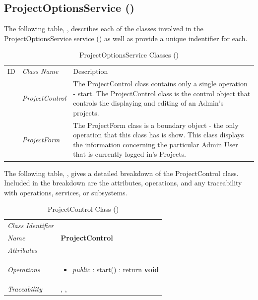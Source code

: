 \documentclass[12pt,letterpaper]{article}
\begin{document}
\subsection{ProjectOptionsService ()}

The following table, , describes each of the classes involved in the ProjectOptionsService service () as well as provide a unique indentifier for each.

\begin{table}[H]
	\caption{ProjectOptionsService Classes ()} 
	\begin{tabu} to 
	    \tableheader{}ID & Class Name & Description \\
		 & ProjectControl & The ProjectControl class contains only a single operation - start. The ProjectControl class is the control object that controls the displaying and editing of an Admin's projects.\\
		 & ProjectForm & The ProjectForm class is a boundary object - the only operation that this class has is show. This class displays the information concerning the particular Admin User that is currently logged in's Projects.\\
	\end{tabu}
\end{table}

The following table, , gives a detailed breakdown of the ProjectControl class. Included in the breakdown are the attributes, operations, and any traceability with operations, services, or subsystems.

\begin{table}[H]
    \caption{ProjectControl Class ()} 
	\begin{tabu} to 
		\toprule
		Class Identifier &  \\
		Name & {\bf ProjectControl} \\
		Attributes & \\

		Operations &
		\begin{minipage}[t]{\linewidth}
			\begin{itemize}
			    \item {\it public} : start() : return {\bf void}
	        \end{itemize}
	    \end{minipage} \\
	    	Traceability & , , \\
		\toprule
	\end{tabu}
\end{table}
\end{document}
